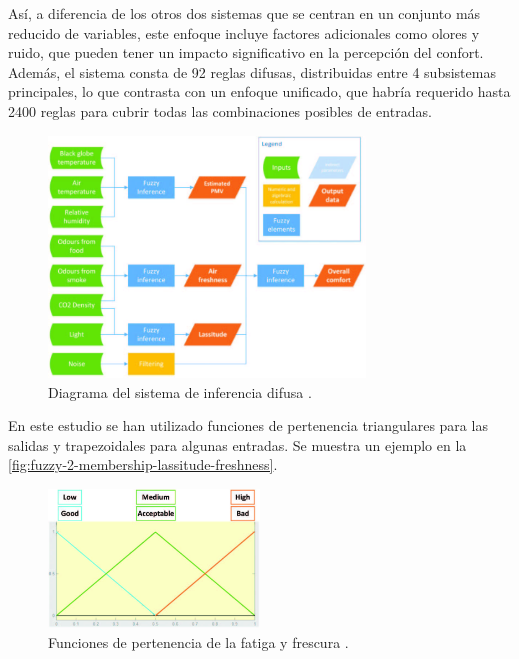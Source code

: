 Así, a diferencia de los otros dos sistemas que se centran en un conjunto más reducido de variables, este enfoque incluye factores adicionales como olores y ruido, que pueden tener un impacto significativo en la percepción del confort. Además, el sistema consta de 92 reglas difusas, distribuidas entre 4 subsistemas principales, lo que contrasta con un enfoque unificado, que habría requerido hasta 2400 reglas para cubrir todas las combinaciones posibles de entradas.

\begin{figure}[H]
	\centering
	\includegraphics[width=0.75\textwidth]{imgs/fuzzy-inference-system-diagram.JPG}
	\caption{Diagrama del sistema de inferencia difusa \parencite{jablonski2018fuzzy}.}
	\label{fig:fuzzy-inference-system-diagram}
\end{figure}

En este estudio se han utilizado funciones de pertenencia triangulares para las salidas y trapezoidales para algunas entradas. Se muestra un ejemplo en la \autoref{fig:fuzzy-2-membership-lassitude-freshness}. 

\begin{figure}[H]
	\centering
	\includegraphics[width=0.5\textwidth]{imgs/fuzzy-2-membership-lassitude-freshness.JPG}
	\caption{Funciones de pertenencia de la fatiga y frescura \parencite{jablonski2018fuzzy}.}
	\label{fig:fuzzy-2-membership-lassitude-freshness}
\end{figure}

